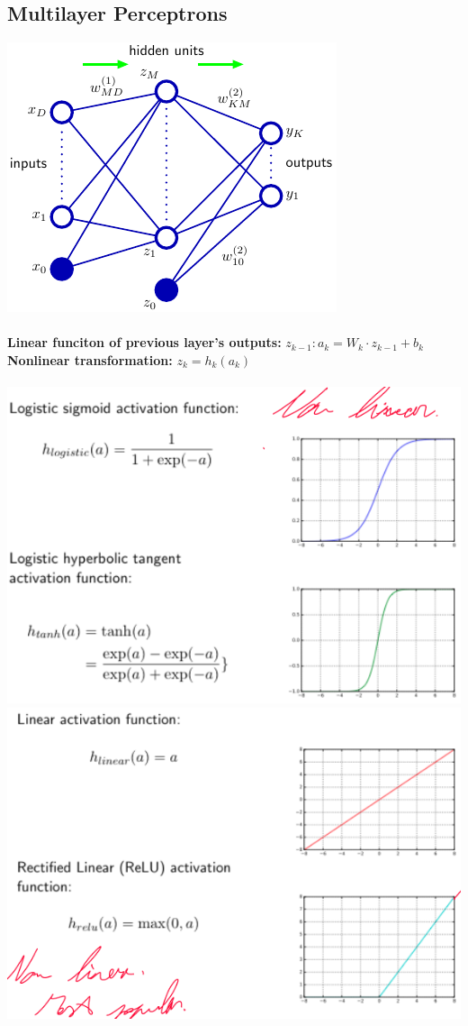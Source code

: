 \documentclass{article}
\begin{document}
\subsection{Multilayer Perceptrons}
\includegraphics[scale=0.3]{92.png}\\\\
\textbf{Linear funciton of previous layer's outputs: }$z_{k-1}:a_k = W_k\cdot z_{k-1}+b_k$\\
\textbf{Nonlinear transformation: }$z_k = h_k(a_k)$\\\\
\includegraphics[scale=0.3]{93.png}\includegraphics[scale=0.3]{94.png}\\\\
\end{document}
